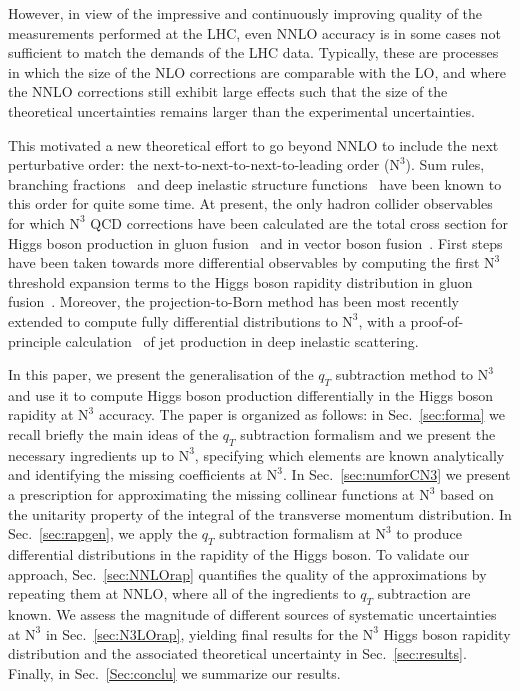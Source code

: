 \documentclass[12pt]{article}
\DeclareRobustCommand{\qt}{\ensuremath{q_T}\xspace}
\DeclareRobustCommand{\LO}{\text{LO}\xspace}
\DeclareRobustCommand{\N}[1]{\ensuremath{\text{N}^{#1}}} %
\begin{document}
However, in view of the impressive and continuously improving quality of the measurements performed at the LHC, even NNLO accuracy is in some cases not sufficient to match the demands of the LHC data. Typically, these are processes in which the size of the NLO corrections are comparable with the LO, and where the NNLO corrections still exhibit large effects such that the size of the theoretical uncertainties remains larger than the experimental uncertainties. 

This motivated a new theoretical effort to go beyond NNLO to include the next perturbative order: the next-to-next-to-next-to-leading order (\N3\LO). Sum rules, branching fractions~\cite{Chetyrkin:1994js} and deep inelastic structure functions~\cite{Vermaseren:2005qc} have been known to this order for quite some time. At present, the only hadron collider observables for which \N3\LO QCD corrections have been calculated are the total cross section for Higgs boson  production in gluon fusion~\cite{Anastasiou:2015ema,Mistlberger:2018etf} and in vector boson 
fusion~\cite{Dreyer:2016oyx}. First steps have been taken towards more differential observables by computing the first \N3\LO threshold expansion terms to the Higgs boson rapidity distribution in gluon fusion~\cite{Dulat:2017prg}. Moreover, the projection-to-Born method has been most recently extended to compute fully differential distributions to \N3\LO, with a proof-of-principle calculation~\cite{Currie:2018fgr} of jet production in deep inelastic scattering. 

In this paper, we present the generalisation of the $\qt$ subtraction method to \N3\LO and use it to compute Higgs boson production differentially in the Higgs boson rapidity at \N3\LO accuracy. The paper is organized as follows: in Sec.~\ref{sec:forma} we recall briefly the main ideas of the $\qt$ subtraction formalism and we present the necessary ingredients up to  \N3\LO, specifying which elements are known analytically and identifying the missing coefficients at \N3\LO. In Sec.~\ref{sec:numforCN3} we present a prescription for approximating the missing collinear functions at \N3\LO based on the unitarity property of the integral of the transverse momentum distribution. In Sec.~\ref{sec:rapgen}, we apply the $\qt$ subtraction formalism at \N3\LO to produce differential distributions in the rapidity of the Higgs boson. To validate our approach, Sec.~\ref{sec:NNLOrap} quantifies the quality of the approximations by repeating them at NNLO, where all of the ingredients to $\qt$ subtraction are known. We assess the magnitude of different sources of systematic uncertainties at  \N3\LO in Sec.~\ref{sec:N3LOrap}, yielding final results for the \N3\LO Higgs boson rapidity distribution and the associated theoretical uncertainty in Sec.~\ref{sec:results}. Finally, in Sec.~\ref{Sec:conclu} we summarize our results.
\end{document}
